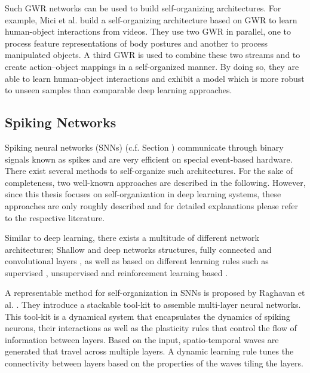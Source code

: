 Such GWR networks can be used to build self-organizing architectures.
For example, Mici et al.  build a self-organizing architecture based on GWR to learn human-object interactions from videos.
They use two GWR in parallel, one to process feature representations of body postures and another to process manipulated objects.
A third GWR is used to combine these two streams and to create action–object mappings in a self-organized manner.
By doing so, they are able to learn human-object interactions and exhibit a model which is more robust to unseen samples than comparable deep learning approaches.


\subsection{Spiking Networks}
Spiking neural networks (SNNs) (c.f. Section ) communicate through binary signals known as spikes and are very efficient on special event-based hardware.
There exist several methods to self-organize such architectures.
For the sake of completeness, two well-known approaches are described in the following.
However, since this thesis focuses on self-organization in deep learning systems, these approaches are only roughly described and for detailed explanations please refer to the respective literature.

Similar to deep learning, there exists a multitude of different network architectures; Shallow  and deep networks  structures, fully connected  and convolutional layers , as well as based on different learning rules such as supervised , unsupervised  and reinforcement learning based .

A representable method for self-organization in SNNs is proposed by Raghavan et al. .
They introduce a stackable tool-kit to assemble multi-layer neural networks.
This tool-kit is a dynamical system that encapsulates the dynamics of spiking neurons, their interactions as well as the plasticity rules that control the flow of information between layers.
Based on the input, spatio-temporal waves are generated that travel across multiple layers.
A dynamic learning rule tunes the connectivity between layers based on the properties of the waves tiling the layers.

